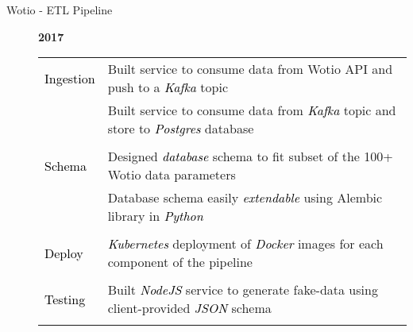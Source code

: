 \documentclass[12pt]{article}
\begin{document}
\begin{description}
\begin{description}
                \item[Wotio - ETL Pipeline] \hfill \textbf{2017}\\
		\textcolor{gray}{
			    \begin{tabular}{l|l}
					\\[-1.0mm]
				\textcolor{black}{Ingestion}    & Built service to consume data from Wotio API and push to a \textcolor{black}{\textit{Kafka}} topic\\
					  & Built service to consume data from \textcolor{black}{\textit{Kafka}} topic and store to \textcolor{black}{\textit{Postgres}} database\\
					\\[-1.7mm]
				\textcolor{black}{Schema}   & Designed \textcolor{black}{\textit{database}} schema to fit subset of the 100+ Wotio data parameters\\
					  & Database schema easily \textcolor{black}{\textit{extendable}} using Alembic library in \textcolor{black}{\textit{Python}}\\
					\\[-1.7mm]
				\textcolor{black}{Deploy}& \textcolor{black}{\textit{Kubernetes}} deployment of \textcolor{black}{\textit{Docker}} images for each component of the pipeline\\
					\\[-1.7mm]
				\textcolor{black}{Testing}      & Built \textcolor{black}{\textit{NodeJS}} service to generate fake-data using client-provided \textcolor{black}{\textit{JSON}} schema\\
					\\[-1.0mm]
			    \end{tabular}
		}


\end{description}
\end{description}
\end{document}
